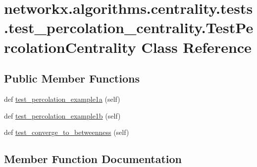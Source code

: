 \hypertarget{classnetworkx_1_1algorithms_1_1centrality_1_1tests_1_1test__percolation__centrality_1_1TestPercolationCentrality}{}\section{networkx.\+algorithms.\+centrality.\+tests.\+test\+\_\+percolation\+\_\+centrality.\+Test\+Percolation\+Centrality Class Reference}
\label{classnetworkx_1_1algorithms_1_1centrality_1_1tests_1_1test__percolation__centrality_1_1TestPercolationCentrality}
\subsection*{Public Member Functions}
\begin{DoxyCompactItemize}
\item 
def \hyperlink{classnetworkx_1_1algorithms_1_1centrality_1_1tests_1_1test__percolation__centrality_1_1TestPercolationCentrality_ac060c776796db981a51664579aa016ca}{test\+\_\+percolation\+\_\+example1a} (self)
\item 
def \hyperlink{classnetworkx_1_1algorithms_1_1centrality_1_1tests_1_1test__percolation__centrality_1_1TestPercolationCentrality_a549b9b2174eb669fb60a746a8624d14c}{test\+\_\+percolation\+\_\+example1b} (self)
\item 
def \hyperlink{classnetworkx_1_1algorithms_1_1centrality_1_1tests_1_1test__percolation__centrality_1_1TestPercolationCentrality_a2d88b9adfe95d93a6c4be63b4ec88207}{test\+\_\+converge\+\_\+to\+\_\+betweenness} (self)
\end{DoxyCompactItemize}


\subsection{Member Function Documentation}
\mbox{\label{classnetworkx_1_1algorithms_1_1centrality_1_1tests_1_1test__percolation__centrality_1_1TestPercolationCentrality_a2d88b9adfe95d93a6c4be63b4ec88207}} 
